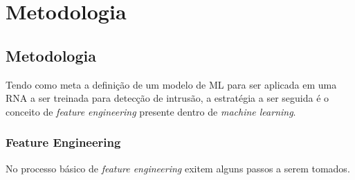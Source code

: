 \part{Metodologia}
\chapter[Metodologia]{Metodologia}

Tendo como meta a definição de um modelo de ML para ser aplicada em uma RNA a ser treinada para detecção de intrusão, a estratégia a ser seguida é o conceito de \textit{feature engineering} presente dentro de \textit{machine learning}.

\section{Feature Engineering}
    No processo básico de \textit{feature engineering} exitem alguns passos a serem tomados.

